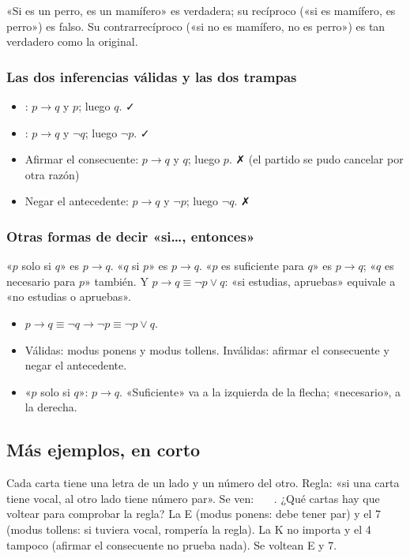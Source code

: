 «Si es un perro, es un mamífero» es verdadera; su recíproco («si es mamífero, es perro») es falso. Su contrarrecíproco
(«si no es mamífero, no es perro») es tan verdadero como la original.

\subsubsection{Las dos inferencias válidas y las dos trampas}
\begin{itemize}
  \item {}: $p \to q$ y $p$; luego $q$. ✓
  \item {}: $p \to q$ y $\neg q$; luego $\neg p$. ✓
  \item Afirmar el consecuente: $p \to q$ y $q$; luego $p$. ✗ (el partido se pudo cancelar por otra razón)
  \item Negar el antecedente: $p \to q$ y $\neg p$; luego $\neg q$. ✗
\end{itemize}

\subsubsection{Otras formas de decir «si…, entonces»}
«$p$ solo si $q$» es $p \to q$. «$q$ si $p$» es $p \to q$. «$p$ es suficiente para $q$» es $p \to q$; «$q$ es necesario
para $p$» también. Y $p \to q \equiv \neg p \vee q$: «si estudias, apruebas» equivale a «no estudias o apruebas».


\begin{regla}
\begin{itemize}
  \item $p \to q \equiv \neg q \to \neg p \equiv \neg p \vee q$.
  \item Válidas: modus ponens y modus tollens. Inválidas: afirmar el consecuente y negar el antecedente.
  \item «$p$ solo si $q$»: $p \to q$. «Suficiente» va a la izquierda de la flecha; «necesario», a la derecha.
\end{itemize}
\end{regla}

\subsection{Más ejemplos, en corto}
\begin{ejemplo}
Cada carta tiene una letra de un lado y un número del otro. Regla: «si una carta tiene vocal, al otro lado tiene número
par». Se ven: \ \ \ . ¿Qué cartas hay que voltear para comprobar la regla?
\solucion La E (modus ponens: debe tener par) y el 7 (modus tollens: si tuviera vocal, rompería la regla). La K no
importa y el 4 tampoco (afirmar el consecuente no prueba nada). Se voltean E y 7.
\end{ejemplo}

